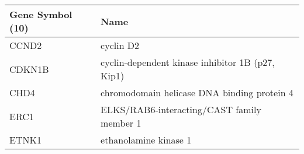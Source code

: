 \begin{tabular}{ll}
\toprule
Gene Symbol (10) &                                             Name \\
\midrule
           CCND2 &                                        cyclin D2 \\
          CDKN1B & cyclin-dependent kinase inhibitor 1B (p27, Kip1) \\
            CHD4 &      chromodomain helicase DNA binding protein 4 \\
            ERC1 &       ELKS/RAB6-interacting/CAST family member 1 \\
           ETNK1 &                            ethanolamine kinase 1 \\
\bottomrule
\end{tabular}

